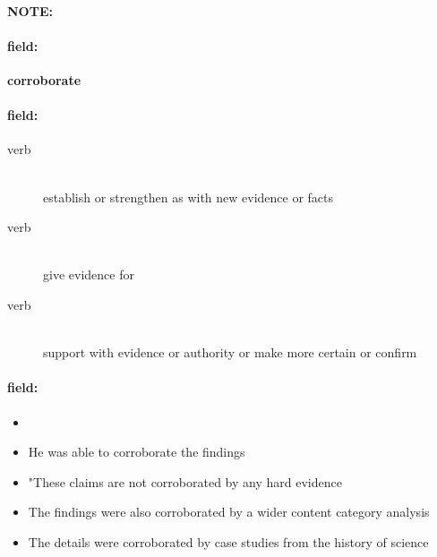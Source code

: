 \documentclass[12pt]{article}
\newenvironment{note}{\paragraph{NOTE:}}{}
\newenvironment{field}{\paragraph{field:}}{}
\begin{document}
\begin{note}
\begin{field}
\textbf{\large corroborate}
\end{field}


\begin{field}
\begin{description}
\item[verb] \hfill \\ 
establish or strengthen as with new evidence or facts

\item[verb] \hfill \\ 
give evidence for

\item[verb] \hfill \\ 
support with evidence or authority or make more certain or confirm

\end{description}
\end{field}

\begin{field}
\begin{itemize}
\item 
\item He was able to corroborate the findings
\item "These claims are not corroborated by any hard evidence
\item The findings were also corroborated by a wider content category analysis
\item The details were corroborated by case studies from the history of science
\end{itemize}
\end{field}
\end{note}
\end{document}
